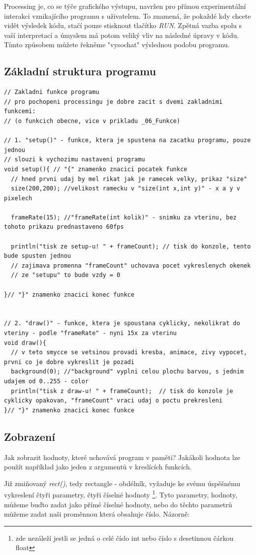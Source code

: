\documentclass[11pt]{book}
\newcommand{\pododdil}[1]{\subsection{#1}\label{subsec:#1}}
\newcommand{\vyraz}[1]{\textit{\gls{#1}}\index{#1}}
\begin{document}
Processing je, co se týče grafického výstupu, navržen pro přímou experimentální interakci vznikajícího programu s uživatelem. To znamená, že pokaždé kdy chcete vidět výsledek kódu, stačí pouze stisknout tlačítko {\em RUN}. Zpětná vazba spolu s vaší interpretací a úmyslem má potom veliký vliv na následné úpravy v kódu. Tímto způsobem můžete řekněme "vysochat" výslednou podobu programu.

\pododdil{Základní struktura programu}

\begin{lstlisting}
// Zakladni funkce programu
// pro pochopeni processingu je dobre zacit s dvemi zakladnimi funkcemi:
// (o funkcich obecne, vice v prikladu _06_Funkce) 

// 1. "setup()" - funkce, ktera je spustena na zacatku programu, pouze jednou
// slouzi k vychozimu nastaveni programu
void setup(){ // "{" znamenko znacici pocatek funkce
  // hned prvni udaj by mel rikat jak je ramecek velky, prikaz "size"
  size(200,200); //velikost ramecku v "size(int x,int y)" - x a y v pixelech
  
  frameRate(15); //"frameRate(int kolik)" - snimku za vterinu, bez tohoto prikazu prednastaveno 60fps 
  
  println("tisk ze setup-u! " + frameCount); // tisk do konzole, tento bude spusten jednou
  // zajimava promenna "frameCount" uchovava pocet vykreslenych okenek
  // ze "setupu" to bude vzdy = 0
  
}// "}" znamenko znacici konec funkce


// 2. "draw()" - funkce, ktera je spoustana cyklicky, nekolikrat do vteriny - podle "frameRate" - nyni 15x za vterinu
void draw(){
  // v teto smycce se vetsinou provadi kresba, animace, zivy vypocet, prvni co je dobre vykreslit je pozadi
  background(0); //"background" vyplni celou plochu barvou, s jednim udajem od 0..255 - color
  println("tisk z draw-u! " + frameCount);  // tisk do konzole je cyklicky opakovan, "frameCount" vraci udaj o poctu prekresleni
}// "}" znamenko znacici konec funkce

\end{lstlisting}


\pododdil{Zobrazení}

Jak zobrazit hodnoty, které uchovává program v paměti? Jakákoli hodnota lze použít například jako jeden z argumentů v kreslících funkcích.

Již zmiňovaný \vyraz{rect()}, tedy rectangle - obdélník, vyžaduje ke svému úspěšnému vykreslení čtyři parametry, čtyři číselné hodnoty \footnote{zde nezáleží jestli se jedná o celé číslo int nebo číslo s desetinnou čárkou float}. Tyto parametry, hodnoty, můžeme buďto zadat jako přímé číselné hodnoty, nebo do těchto parametrů můžeme zadat naši proměnnou která obsahuje číslo. Názorně:
\end{document}
